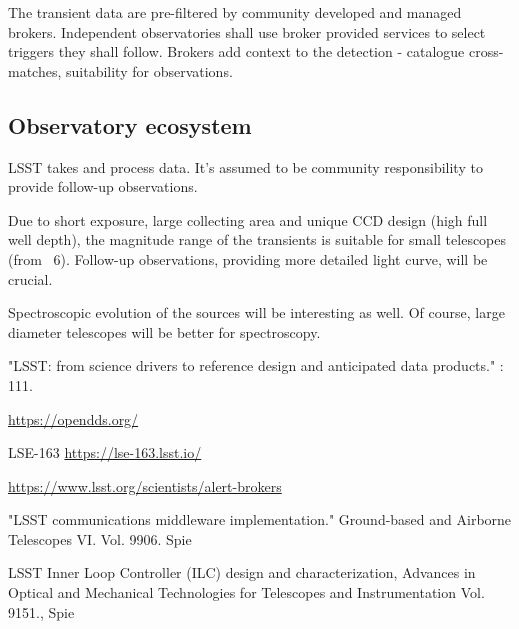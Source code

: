 \documentclass[proceedings, preprint]{rmaa}
\begin{document}
The transient data are pre-filtered by community developed and managed
brokers\cite{databrokers}. Independent observatories shall use broker provided
services to select triggers they shall follow. Brokers add context to the
detection - catalogue cross-matches, suitability for observations.

\subsection{Observatory ecosystem}

LSST takes and process data. It's assumed to be community responsibility to
provide follow-up observations.

Due to short exposure, large collecting area and unique CCD design (high full
well depth), the magnitude range of the transients is suitable for small
telescopes (from ~6). Follow-up observations, providing more detailed light
curve, will be crucial.

Spectroscopic evolution of the sources will be interesting as well. Of course,
large diameter telescopes will be better for spectroscopy.


\begin{thebibliography}
	 "LSST: from science drivers to reference design and anticipated data products." : 111.

  \url{https://opendds.org/}

  LSE-163 \url{https://lse-163.lsst.io/}

  \url{https://www.lsst.org/scientists/alert-brokers}

  "LSST communications middleware implementation." Ground-based and Airborne Telescopes VI. Vol. 9906. Spie

  LSST Inner Loop Controller (ILC) design and characterization, Advances in Optical and Mechanical Technologies for Telescopes and Instrumentation Vol. 9151., Spie

\end{thebibliography}
\end{document}
